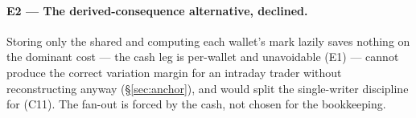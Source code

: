 \paragraph{E2 --- The derived-consequence alternative, declined.} Storing only the shared
 and computing each wallet's mark lazily saves nothing on the dominant
cost --- the cash leg is per-wallet and unavoidable (E1) --- cannot produce the correct variation
margin for an intraday trader without reconstructing \ac{} anyway (\S\ref{sec:anchor}), and would
split the single-writer discipline for \ac{} (C11). The fan-out is forced by the cash, not chosen for
the bookkeeping.
